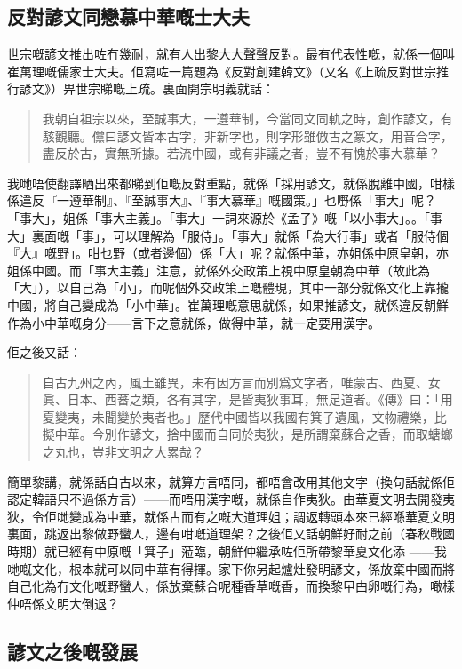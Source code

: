 \documentclass[a5paper, 10pt, openany]{book} %
\begin{document}
\subsection*{反對諺文同戀慕中華嘅士大夫}
世宗嘅諺文推出咗冇幾耐，就有人出黎大大聲聲反對。最有代表性嘅，就係一個叫崔萬理嘅儒家士大夫。佢寫咗一篇題為《反對創建韓文》（又名《上疏反對世宗推行諺文》）畀世宗睇嘅上疏。裏面開宗明義就話：
\begin{quotation}
  我朝自祖宗以來，至誠事大，一遵華制，今當同文同軌之時，創作諺文，有駭觀聽。儻曰諺文皆本古字，非新字也，則字形雖倣古之篆文，用音合字，盡反於古，實無所據。若流中國，或有非議之者，豈不有愧於事大慕華？
\end{quotation}

我哋唔使翻譯晒出來都睇到佢嘅反對重點，就係「採用諺文，就係脫離中國，咁樣係違反『一遵華制』、『至誠事大』、『事大慕華』嘅國策。」乜嘢係「事大」呢？「事大」，姐係「事大主義」。「事大」一詞來源於《孟子》嘅「以小事大」。。「事大」裏面嘅「事」，可以理解為「服侍」。「事大」就係「為大行事」或者「服侍個『大』嘅野」。咁乜野（或者邊個）係「大」呢？就係中華，亦姐係中原皇朝，亦姐係中國。而「事大主義」注意，就係外交政策上視中原皇朝為中華（故此為「大」），以自己為「小」，而呢個外交政策上嘅體現，其中一部分就係文化上靠攏中國，將自己變成為「小中華」。崔萬理嘅意思就係，如果推諺文，就係違反朝鮮作為小中華嘅身分——言下之意就係，做得中華，就一定要用漢字。

佢之後又話：

\begin{quotation}
  自古九州之內，風土雖異，未有因方言而別爲文字者，唯蒙古、西夏、女眞、日本、西蕃之類，各有其字，是皆夷狄事耳，無足道者。《傳》曰：「用夏變夷，未聞變於夷者也。」歷代中國皆以我國有箕子遺風，文物禮樂，比擬中華。今別作諺文，捨中國而自同於夷狄，是所謂棄蘇合之香，而取螗螂之丸也，豈非文明之大累哉？
\end{quotation}

簡單黎講，就係話自古以來，就算方言唔同，都唔會改用其他文字（換句話就係佢認定韓語只不過係方言）——而唔用漢字嘅，就係自作夷狄。由華夏文明去開發夷狄，令佢哋變成為中華，就係古而有之嘅大道理姐；調返轉頭本來已經喺華夏文明裏面，跳返出黎做野蠻人，邊有咁嘅道理架？之後佢又話朝鮮好耐之前（春秋戰國時期）就已經有中原嘅「箕子」蒞臨，朝鮮仲繼承咗佢所帶黎華夏文化添
——我哋嘅文化，根本就可以同中華有得揮。家下你另起爐灶發明諺文，係放棄中國而將自己化為冇文化嘅野蠻人，係放棄蘇合呢種香草嘅香，而換黎曱甴卵嘅行為，噉樣仲唔係文明大倒退？

\subsection*{諺文之後嘅發展}
\end{document}
